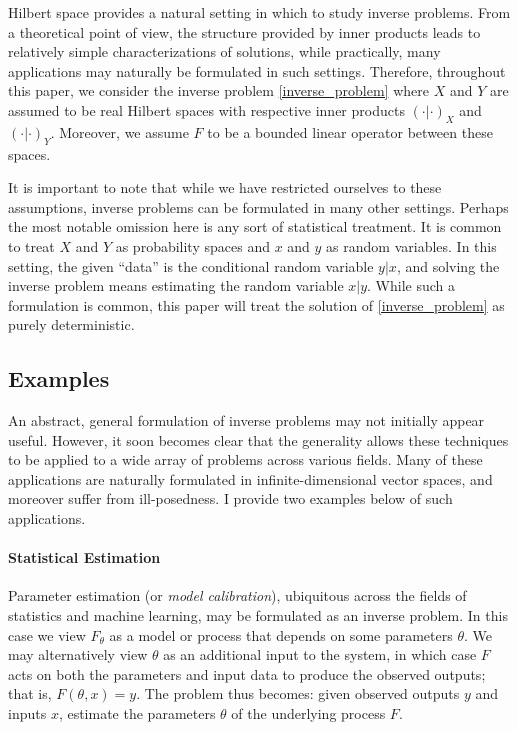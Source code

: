 \documentclass[12pt]{article}
\begin{document}
Hilbert space provides a natural setting in which to study inverse problems. From a theoretical point of view, the structure provided by 
inner products leads to relatively simple characterizations of solutions, while practically, many applications may 
naturally be formulated in such settings. Therefore, throughout this paper, we consider the inverse problem \eqref{inverse_problem}
where $X$ and $Y$ are assumed to be real Hilbert spaces with respective inner products $(\cdot | \cdot)_X$ and $(\cdot | \cdot)_Y$. 
Moreover, we assume $F$ to be a bounded linear operator between these spaces. 

It is important to note that while we have restricted ourselves to these assumptions, inverse problems can be formulated in many 
other settings. Perhaps the most notable omission here is any sort of statistical treatment. It is common to treat $X$ and $Y$ as
probability spaces and $x$ and $y$ as random variables. In this setting, the given ``data'' is the conditional random variable 
$y|x$, and solving the inverse problem means estimating the random variable $x|y$. While such a formulation is common, this 
paper will treat the solution of \eqref{inverse_problem} as purely deterministic.  

 \subsection{Examples}
 
 An abstract, general formulation of inverse problems may not initially appear useful. 
 However, it soon becomes clear that the generality allows these techniques to be 
 applied to a wide array of problems across various fields. Many of these applications 
 are naturally formulated in infinite-dimensional vector spaces, and moreover suffer from
  ill-posedness. I provide two examples below of such applications. 
 
 \paragraph*{Statistical Estimation}
 Parameter estimation (or \textit{model calibration}), ubiquitous across the fields of statistics 
 and machine learning, may be formulated as an inverse problem. In this case we view 
 $F_\theta$ as a model or process that depends on some parameters $\theta$. We may
  alternatively view $\theta$ as an additional input to the system, in which case $F$ acts 
  on both the parameters and input data to produce the observed outputs; that is, 
  $F(\theta, x) = y$. The problem thus becomes: given observed outputs $y$ and inputs $x$, 
  estimate the parameters $\theta$ of the underlying process $F$. 
  
\end{document}
